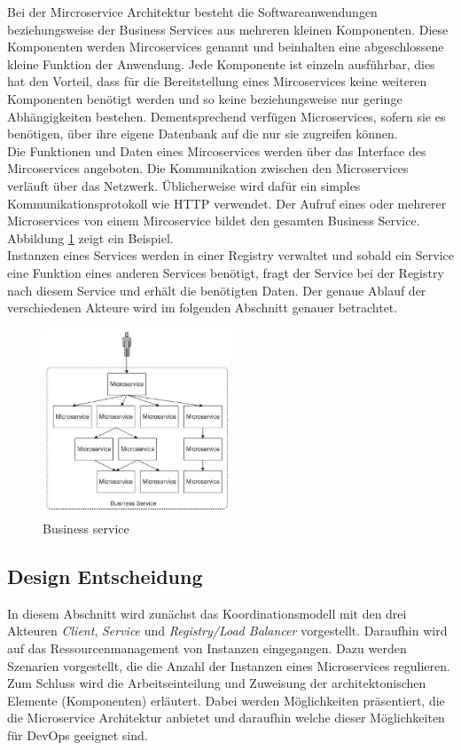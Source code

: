 Bei der Mircroservice Architektur besteht die Softwareanwendungen beziehungsweise der Business Services aus mehreren kleinen Komponenten. Diese Komponenten werden Mircoservices genannt und beinhalten eine abgeschlossene kleine Funktion der Anwendung. Jede Komponente ist einzeln ausführbar, dies hat den Vorteil, dass für die Bereitstellung eines Mircoservices keine weiteren Komponenten benötigt werden und so keine beziehungsweise nur geringe Abhängigkeiten bestehen. Dementsprechend verfügen Microservices, sofern sie es benötigen, über ihre eigene Datenbank auf die nur sie zugreifen können. \\
Die Funktionen und Daten eines Mircoservices werden über das Interface des Mircoservices angeboten. Die Kommunikation zwischen den Microservices verläuft über das Netzwerk. Üblicherweise wird dafür ein simples Kommunikationsprotokoll wie HTTP verwendet. Der Aufruf eines oder mehrerer Microservices von einem Mircoservice bildet den gesamten Business Service. Abbildung \ref{aService} zeigt ein Beispiel. \\
Instanzen eines Services werden in einer Registry verwaltet und sobald ein Service eine Funktion eines anderen Services benötigt, fragt der Service bei der Registry nach diesem Service und erhält die benötigten Daten. Der genaue Ablauf der verschiedenen Akteure wird im folgenden Abschnitt genauer betrachtet.\\

\begin{figure}[htbp]
  \centering
  \includegraphics[width=0.5\textwidth]{pictures/businessService.png}
	\caption{Business service}
	\label{aService}
\end{figure}

\subsection{Design Entscheidung}
In diesem Abschnitt wird zunächst das Koordinationsmodell mit den drei Akteuren \textit{Client}, \textit{Service} und \textit{Registry/Load Balancer} vorgestellt. Daraufhin wird auf das Ressourcenmanagement von Instanzen eingegangen. Dazu werden Szenarien vorgestellt, die die Anzahl der Instanzen eines Microservices regulieren. Zum Schluss wird die Arbeitseinteilung und Zuweisung der architektonischen Elemente (Komponenten) erläutert. Dabei werden Möglichkeiten präsentiert, die die Microservice Architektur anbietet und daraufhin welche dieser Möglichkeiten für DevOps geeignet sind.

